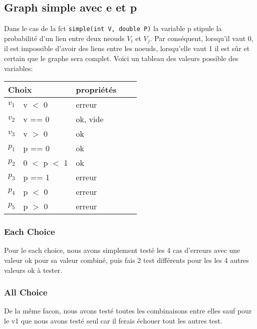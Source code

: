 \documentclass[11pt]{article}
\begin{document}
\subsection{Graph simple avec e et p}
Dans le cas de la fct \verb|simple(int V, double P)| la variable p stipule la probabilité d'un lien entre deux neouds $V_i$ et $V_j$.
Par conséquent, lorsqu'il vaut 0, il est impossible d'avoir des liens entre les noeuds, lorsqu'elle vaut 1 il est sûr et certain que le graphe sera complet.
Voici un tableau des valeurs possible des variables:
\begin{tabular}{|l|l|l|l|l|}
 \hline
 \multicolumn{2}{|l|}{Choix} & propriétés               \\ \hline
 $v_1$                       & v $<$ 0       & erreur   \\ \hline
 $v_2$                       & v == 0        & ok, vide \\ \hline
 $v_3$                       & v $>$ 0       & ok       \\ \hline \hline
 $p_1$                       & p == 0        & ok       \\ \hline
 $p_2$                       & 0 $<$ p $<$ 1 & ok       \\ \hline
 $p_3$                       & p == 1        & erreur   \\ \hline
 $p_4$                       & p $<$ 0       & erreur   \\ \hline
 $p_5$                       & p $>$ 0       & erreur   \\ \hline
\end{tabular}
\subsubsection{Each Choice}
Pour le each choice, nous avons simplement testé les 4 cas d'erreurs avec une valeur ok pour sa valeur combiné, puis fais 2 test différents pour les les 4 autres valeurs ok à tester.
\subsubsection{All Choice}
De la même facon, nous avons testé toutes les combinaisons entre elles sauf pour le v1 que nous avons testé seul car il ferais échouer tout les autres test.
\end{document}
